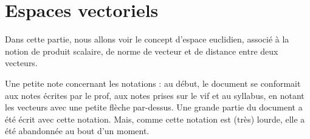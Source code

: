 
%
%


%




\chapter{Espaces vectoriels}

Dans cette partie, nous allons voir le concept d'espace euclidien, associé à la notion de produit scalaire, de norme de vecteur et de distance entre deux vecteurs.

Une petite note concernant les notations : au début, le document se conformait aux notes écrites par le prof, aux notes prises sur le vif et au syllabus, en notant les vecteurs avec une petite flèche par-dessus. Une grande partie du document a été écrit avec cette notation. Mais, comme cette notation est (très) lourde, elle a été abandonnée au bout d'un moment.

